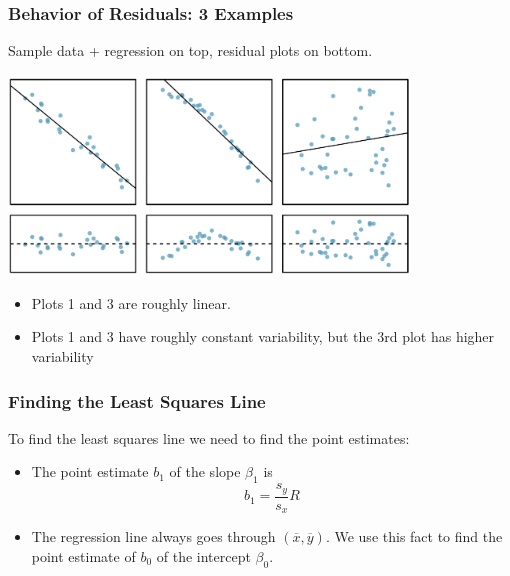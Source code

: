 \documentclass[handout]{beamer}
\newcommand{\blue}[1]{\textcolor{blue2}{#1}}
\newcommand{\xbar}{\overline{x}}
\newcommand{\ybar}{\overline{y}}
\begin{document}
\begin{frame}[fragile]
\frametitle{Behavior of Residuals:  3 Examples}

Sample data + regression on top, residual plots on bottom.  
\begin{center}
\includegraphics[width=0.8\textwidth]{figure/resid.png}
\end{center}
\begin{itemize}
\pause\item Plots 1 and 3 are roughly linear.
\pause\item Plots 1 and 3 have roughly constant variability, but the 3rd plot has higher variability
\end{itemize}


\end{frame}







\begin{frame}[fragile]
\frametitle{Finding the Least Squares Line}
%
%
To find the least squares line we need to find the point estimates:
\begin{itemize}
\item The point estimate $b_1$ of the slope $\beta_1$ is
\[
b_1 = \frac{s_y}{s_x}R
\]
\pause\item The regression line \blue{always} goes through $(\xbar, \ybar)$.  We use this fact to find the point estimate of $b_0$ of the intercept $\beta_0$.
\end{itemize}
 
\end{frame}
\end{document}
